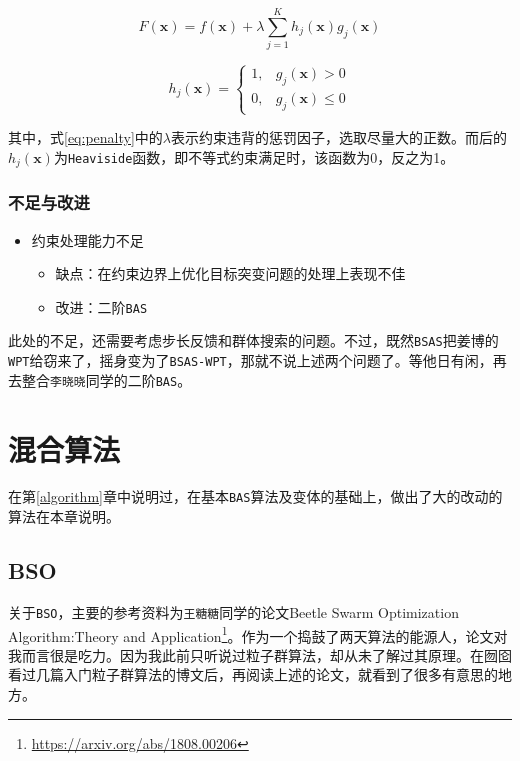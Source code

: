\documentclass[]{ctexbook}
\providecommand{\tightlist}{%
  \setlength{\itemsep}{0pt}\setlength{\parskip}{0pt}}
\renewcommand{\href}[2]{#2\footnote{\url{#1}}}
\theoremstyle{definition}
\theoremstyle{definition}
\theoremstyle{definition}
\theoremstyle{remark}
\begin{document}
\begin{equation}
F(\mathbf{x})=f(\mathbf{x})+\lambda\sum_{j=1}^{K}h_j(\mathbf{x})g_j(\mathbf{x})
\label{eq:penalty}
\end{equation}

\begin{equation}
h_j(\mathbf{x}) = \begin{cases} 
1, & g_j(\mathbf{x})>0 \\ 
0, & g_j(\mathbf{x})\leq0
\end{cases}
\label{eq:violation}
\end{equation}

其中，式\eqref{eq:penalty}中的\(\lambda\)表示约束违背的惩罚因子，选取尽量大的正数。而后的\(h_j(\mathbf{x})\)为\texttt{Heaviside}函数，即不等式约束满足时，该函数为0，反之为1。

\subsection{不足与改进}\label{BSASimprove}

\begin{itemize}
\tightlist
\item
  约束处理能力不足

  \begin{itemize}
  \tightlist
  \item
    缺点：在约束边界上优化目标突变问题的处理上表现不佳
  \item
    改进：二阶\texttt{BAS}
  \end{itemize}
\end{itemize}

此处的不足，还需要考虑步长反馈和群体搜索的问题。不过，既然\texttt{BSAS}把姜博的\texttt{WPT}给窃来了，摇身变为了\texttt{BSAS-WPT}，那就不说上述两个问题了。等他日有闲，再去整合\texttt{李晓晓}同学的二阶\texttt{BAS}。

\chapter{混合算法}\label{mixedalgorithm}

在第\ref{algorithm}章中说明过，在基本\texttt{BAS}算法及变体的基础上，做出了大的改动的算法在本章说明。

\section{BSO}\label{bso}

关于\texttt{BSO}，主要的参考资料为\texttt{王糖糖}同学的论文\href{https://arxiv.org/abs/1808.00206}{Beetle
Swarm Optimization Algorithm:Theory and
Application}。作为一个捣鼓了两天算法的能源人，论文对我而言很是吃力。因为我此前只听说过粒子群算法，却从未了解过其原理。在囫囵看过几篇入门粒子群算法的博文后，再阅读上述的论文，就看到了很多有意思的地方。
\end{document}

